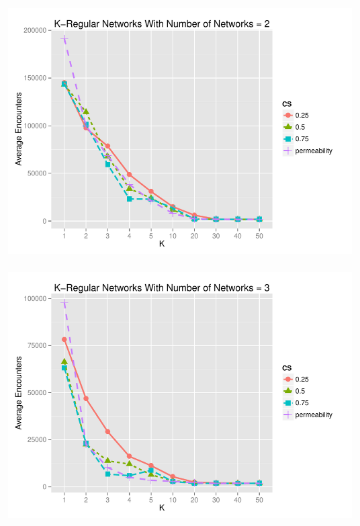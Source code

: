\documentclass[preprint,number]{elsarticle}
\begin{document}
\begin{figure}[H]
	\centering
	\begin{subfigure}{.49\linewidth}
		\centering
		\includegraphics[width=1\linewidth]{"../analysis/pdf/context_switching_encounters_comp_kregular_groupedbynets_2"}
		\caption{}
		\label{fig:ctx_switching_comp_kreg_2}
	\end{subfigure}%
	\begin{subfigure}{.5\linewidth}
		\centering
		\includegraphics[width=1\linewidth]{"../analysis/pdf/context_switching_encounters_comp_kregular_groupedbynets_3"}
		\caption{}
		\label{fig:ctx_switching_comp_kreg_3}
	\end{subfigure}\\
	\begin{subfigure}{.49\linewidth}
		\centering

\end{subfigure}
\end{figure}
\end{document}
